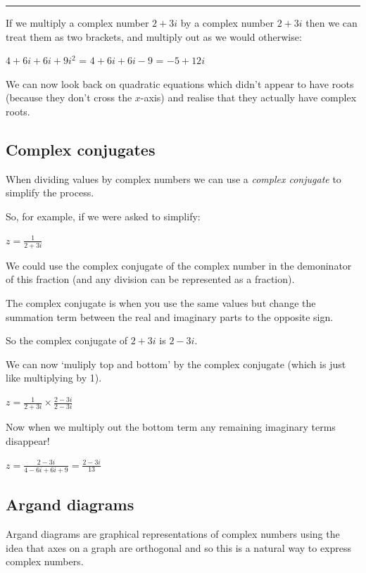 \documentclass[
]{book}
\begin{document}
\begin{center}\rule{0.5\linewidth}{0.5pt}\end{center}

If we multiply a complex number \(2 + 3i\) by a complex number \(2+3i\) then we can treat them as two brackets, and multiply out as we would otherwise:

\(4 + 6 i + 6i + 9i^2\) = \(4 + 6 i + 6i - 9\) = \(-5+ 12i\)

We can now look back on quadratic equations which didn't appear to have roots (because they don't cross the \(x\)-axis) and realise that they actually have complex roots.

\hypertarget{complex-conjugates}{%
\subsection{Complex conjugates}\label{complex-conjugates}}

When dividing values by complex numbers we can use a \emph{complex conjugate} to simplify the process.

So, for example, if we were asked to simplify:

\(z = \frac{1}{2+3i}\)

We could use the complex conjugate of the complex number in the demoninator of this fraction (and any division can be represented as a fraction).

The complex conjugate is when you use the same values but change the summation term between the real and imaginary parts to the opposite sign.

So the complex conjugate of \(2+3i\) is \(2-3i\).

We can now `muliply top and bottom' by the complex conjugate (which is just like multiplying by 1).

\(z = \frac{1}{2+3i}\times \frac{2-3i}{2-3i}\)

Now when we multiply out the bottom term any remaining imaginary terms disappear!

\(z = \frac{2-3i}{4-6i+6i+9} = \frac{2-3i}{13}\)

\hypertarget{argand-diagrams}{%
\subsection{Argand diagrams}\label{argand-diagrams}}

Argand diagrams are graphical representations of complex numbers using the idea that axes on a graph are orthogonal and so this is a natural way to express complex numbers.
\end{document}
